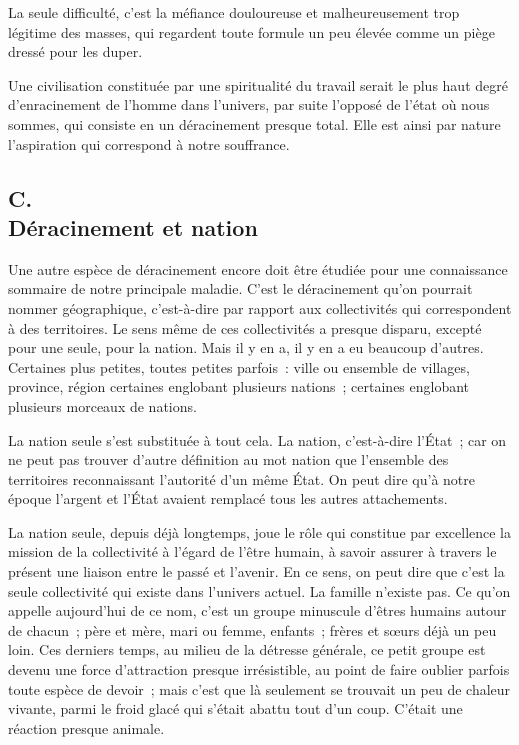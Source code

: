 \documentclass[french,twoside]{book} %
\begin{document}
La seule difficulté, c'est la méfiance douloureuse et malheureusement trop légitime des masses, qui regardent toute formule un peu élevée comme un piège dressé pour les duper.\par
Une civilisation constituée par une spiritualité du travail serait le plus haut degré d'enracinement de l'homme dans l'univers, par suite l'opposé de l'état où nous sommes, qui consiste en un déracinement presque total. Elle est ainsi par nature l'aspiration qui correspond à notre souffrance.
\subsection[C. Déracinement et nation]{C. \\
Déracinement et nation}
\noindent \par
Une autre espèce de déracinement encore doit être étudiée pour une connaissance sommaire de notre principale maladie. C'est le déracinement qu'on pourrait nommer géographique, c'est-à-dire par rapport aux collectivités qui correspondent à des territoires. Le sens même de ces collectivités a presque disparu, excepté pour une seule, pour la nation. Mais il y en a, il y en a eu beaucoup d'autres. Certaines plus petites, toutes petites parfois : ville ou ensemble de villages, province, région certaines englobant plusieurs nations ; certaines englobant plusieurs morceaux de nations.\par
La nation seule s'est substituée à tout cela. La nation, c'est-à-dire l'État ; car on ne peut pas trouver d'autre définition au mot nation que l'ensemble des territoires reconnaissant l'autorité d'un même État. On peut dire qu'à notre époque l'argent et l'État avaient remplacé tous les autres attachements.\par
La nation seule, depuis déjà longtemps, joue le rôle qui constitue par excellence la mission de la collectivité à l'égard de l'être humain, à savoir assurer à travers le présent une liaison entre le passé et l'avenir. En ce sens, on peut dire que c'est la seule collectivité qui existe dans l'univers actuel. La famille n'existe pas. Ce qu'on appelle aujourd'hui de ce nom, c'est un groupe minuscule d'êtres humains autour de chacun ; père et mère, mari ou femme, enfants ; frères et sœurs déjà un peu loin. Ces derniers temps, au milieu de la détresse générale, ce petit groupe est devenu une force d'attraction presque irrésistible, au point de faire oublier parfois toute espèce de devoir ; mais c'est que là seulement se trouvait un peu de chaleur vivante, parmi le froid glacé qui s’était abattu tout d'un coup. C'était une réaction presque animale.\par
\end{document}
